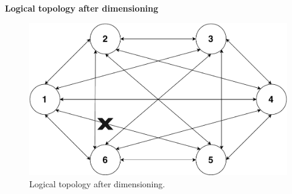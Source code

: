 \textbf{Logical topology after dimensioning}
\begin{figure}[H]
	\centering
	\includegraphics[width=13cm]{sdf/heuristic/transparent/figures/logicalAfterDimensioning}
	\caption{Logical topology after dimensioning.}
\end{figure}
